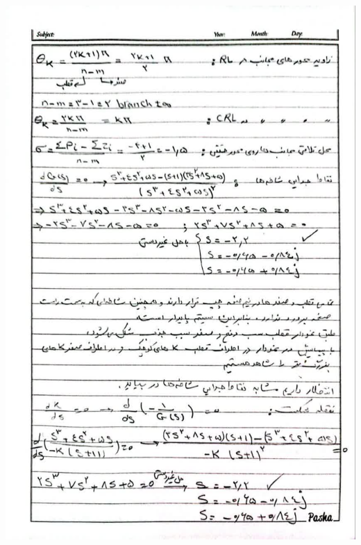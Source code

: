 \documentclass[a4,12pt]{article}
\begin{document}
			\includegraphics[width=15cm]{q2.jpg}
\end{document}
